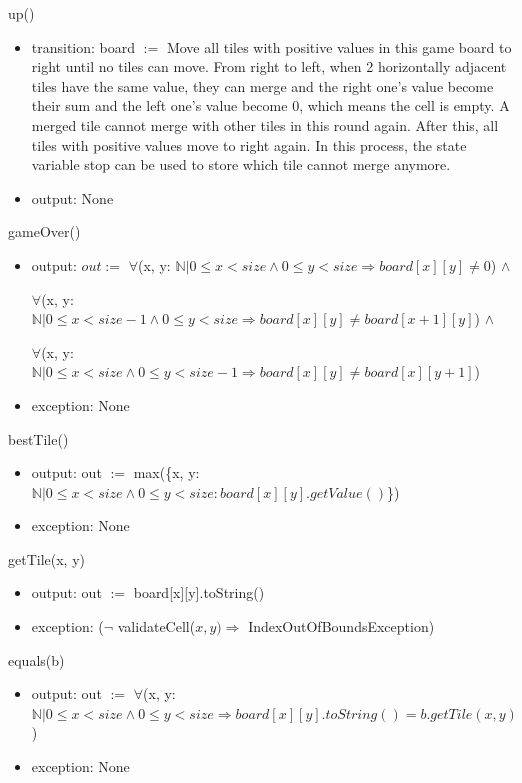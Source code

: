 \documentclass[12pt]{article}
\begin{document}
\noindent up()
\begin{itemize}
\item transition: board $:=$ Move all tiles with positive values in this game board to right until no tiles can move. From right to left, when 2 horizontally adjacent tiles have the same value, they can merge and the right one's value become their sum and the left one's value become 0, which means the cell is empty. A merged tile cannot merge with other tiles in this round again. After this, all tiles with positive values move to right again. In this process, the state variable stop can be used to store which tile cannot merge anymore.
\item output: None
\end{itemize}

\noindent gameOver()
\begin{itemize}
\item output: $out :=$ $\forall$(x, y: $\mathbb{N} | 0 \leq x < size \land 0 \leq y < size \Rightarrow board[x][y] \neq 0$) $\land$ 

$\forall$(x, y: $\mathbb{N} | 0 \leq x < size-1 \land 0 \leq y < size \Rightarrow board[x][y] \neq board[x+1][y]$) $\land$ 

$\forall$(x, y: $\mathbb{N} | 0 \leq x < size \land 0 \leq y < size-1 \Rightarrow board[x][y] \neq board[x][y+1]$)
\item exception: None
\end{itemize}

\noindent bestTile()
\begin{itemize}
\item output: out $:=$ max(\{x, y: $\mathbb{N} | 0 \leq x < size \land 0 \leq y < size: board[x][y].getValue()$\})
\item exception: None
\end{itemize}

\noindent getTile(x, y)
\begin{itemize}
\item output: out $:=$ board[x][y].toString()
\item exception: ($\neg$ validateCell($x, y) \Rightarrow$ IndexOutOfBoundsException)
\end{itemize}

\noindent equals(b)
\begin{itemize}
\item output: out $:=$ $\forall$(x, y: $\mathbb{N} | 0 \leq x < size \land 0 \leq y < size \Rightarrow board[x][y].toString() = b.getTile(x, y)$)
\item exception: None
\end{itemize}
\end{document}
